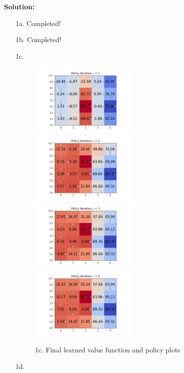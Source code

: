 \documentclass[submit]{harvardml}
\begin{document}
\textbf{Solution:}
\begin{itemize}
    \item[1a.] Completed!
    \item[1b.] Completed!
    \item[1c.]
    \begin{figure}[h!]
        \includegraphics[width=0.5\textwidth]{HW6/Policy_1.png}
        \includegraphics[width=0.5\textwidth]{HW6/Policy_2.png}
        \includegraphics[width=0.5\textwidth]{HW6/Policy_3.png}
        \includegraphics[width=0.5\textwidth]{HW6/Policy_4.png}
        \caption{1c. Final learned value function and policy plots}
    \end{figure}
    \item[1d.]

\end{itemize}
\end{document}
